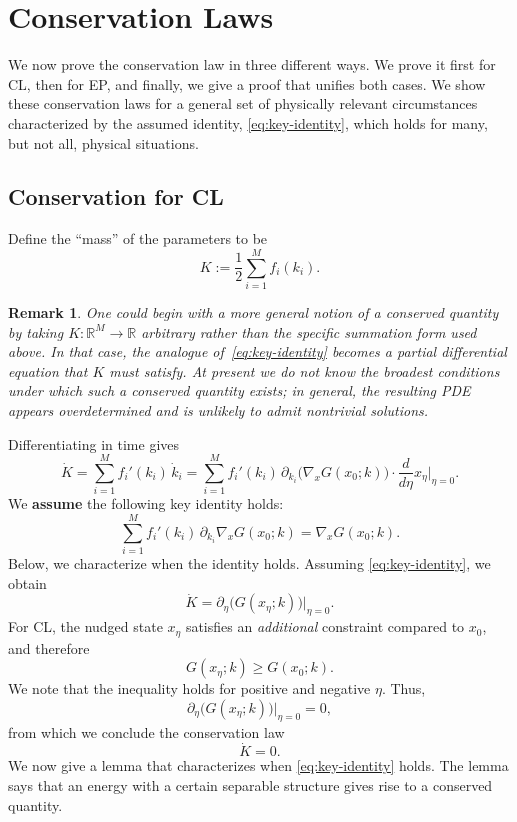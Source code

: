 \documentclass[final, 11pt, nonatbib]{elsarticle}
\theoremstyle{definition}
\theoremstyle{plain}
\newtheorem{remark}[definition]{Remark}
\numberwithin{equation}{section}
\begin{document}
\section{Conservation Laws}
\label{C Laws}
We now prove the conservation law in three different ways. We prove it first for CL, then for EP, and finally, we give a proof that unifies both cases. We show these conservation laws for a general set of physically relevant circumstances characterized by the assumed identity, \eqref{eq:key-identity}, which holds for many, but not all, physical situations.

\subsection{Conservation for CL}
\label{CL C Laws}
Define the ``mass'' of the parameters to be
\begin{equation}  
    K := \frac12 \sum_{i=1}^M f_i(k_i).
    \label{eq:Conserved}
\end{equation}

\begin{remark}
    One could begin with a more general notion of a conserved quantity by taking 
    $K:\mathbb{R}^{M}\to\mathbb{R}$ arbitrary rather than the specific summation form used above.  
    In that case, the analogue of~\eqref{eq:key-identity} becomes a partial differential equation 
    that $K$ must satisfy.  At present we do not know the broadest conditions under which such a 
    conserved quantity exists; in general, the resulting PDE appears overdetermined and is unlikely 
    to admit nontrivial solutions.  
    \label{rmk:overdetermined}
\end{remark}
Differentiating in time gives
\[
    \dot{K}
    = \sum_{i=1}^M f_i'(k_i)\, \dot{k}_i
    = \sum_{i=1}^M f_i'(k_i)\,\partial_{k_i}
    \big( \nabla_x G(x_0;k)\big)\cdot \dfrac{d}{d\eta}x_\eta\bigg|_{\eta=0} .
\]
We {\bf assume} the following key identity holds:
\begin{equation}
    \sum_{i=1}^M f_i'(k_i)\, \partial_{k_i}\nabla_x G(x_0;k)
    = \nabla_x G(x_0;k).
    \label{eq:key-identity}
\end{equation}
Below, we characterize when the identity holds. Assuming \eqref{eq:key-identity}, we obtain
\[
    \dot{K}
    = \partial_\eta\big( G(x_\eta;k)\big)\bigg|_{\eta=0}.
\]
For CL, the nudged state $x_\eta$ satisfies an \emph{additional} constraint compared to $x_0$, and therefore
\[
    G(x_\eta;k) \ge G(x_0;k).
\]
We note that the inequality holds for positive and negative $\eta$. Thus,
\[
    \partial_\eta \big(G(x_\eta;k)\big)\bigg|_{\eta=0} = 0,
\]
from which we conclude the conservation law
\[
    \dot{K} = 0.
\]
We now give a lemma that characterizes when \eqref{eq:key-identity} holds. The lemma says that an energy with a certain separable structure gives rise to a conserved quantity.
\end{document}
